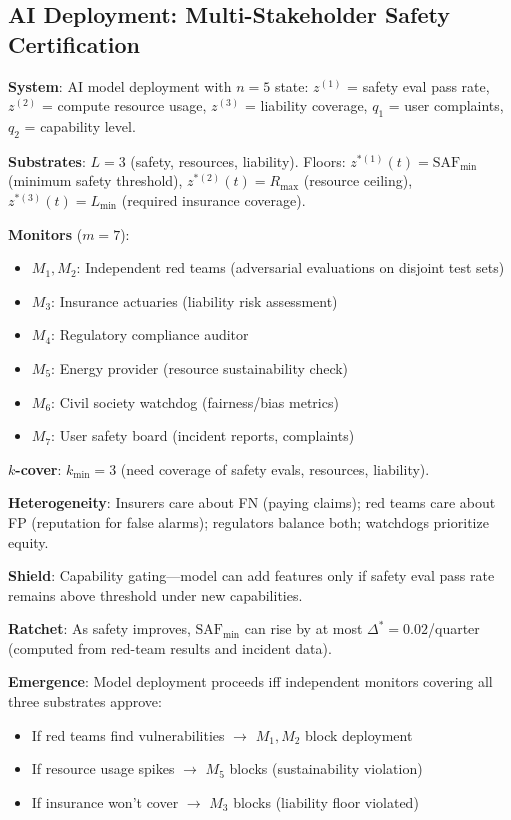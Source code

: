 \documentclass[11pt,a4paper]{article}
\theoremstyle{definition}
\begin{document}
\subsection{AI Deployment: Multi-Stakeholder Safety Certification}

\textbf{System}: AI model deployment with $n = 5$ state: $z^{(1)}$ = safety eval pass rate, $z^{(2)}$ = compute resource usage, $z^{(3)}$ = liability coverage, $q_1$ = user complaints, $q_2$ = capability level.

\textbf{Substrates}: $L = 3$ (safety, resources, liability). Floors: $z^{*(1)}(t) = \text{SAF}_{\min}$ (minimum safety threshold), $z^{*(2)}(t) = R_{\max}$ (resource ceiling), $z^{*(3)}(t) = L_{\min}$ (required insurance coverage).

\textbf{Monitors} ($m = 7$):
\begin{itemize}
\item $M_1, M_2$: Independent red teams (adversarial evaluations on disjoint test sets)
\item $M_3$: Insurance actuaries (liability risk assessment)
\item $M_4$: Regulatory compliance auditor
\item $M_5$: Energy provider (resource sustainability check)
\item $M_6$: Civil society watchdog (fairness/bias metrics)
\item $M_7$: User safety board (incident reports, complaints)
\end{itemize}

\textbf{$k$-cover}: $k_{\min} = 3$ (need coverage of safety evals, resources, liability).

\textbf{Heterogeneity}: Insurers care about FN (paying claims); red teams care about FP (reputation for false alarms); regulators balance both; watchdogs prioritize equity.

\textbf{Shield}: Capability gating---model can add features only if safety eval pass rate remains above threshold under new capabilities.

\textbf{Ratchet}: As safety improves, $\text{SAF}_{\min}$ can rise by at most $\Delta^* = 0.02$/quarter (computed from red-team results and incident data).

\textbf{Emergence}: Model deployment proceeds iff independent monitors covering all three substrates approve:
\begin{itemize}
\item If red teams find vulnerabilities $\to$ $M_1, M_2$ block deployment
\item If resource usage spikes $\to$ $M_5$ blocks (sustainability violation)
\item If insurance won't cover $\to$ $M_3$ blocks (liability floor violated)
\end{itemize}
\end{document}
